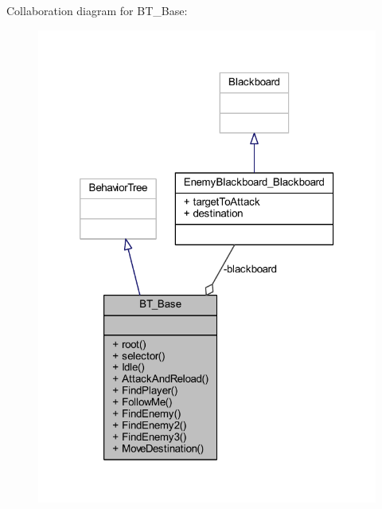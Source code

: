 Collaboration diagram for B\+T\+\_\+\+Base\+:
\nopagebreak
\begin{figure}[H]
\begin{center}
\leavevmode
\includegraphics[width=320pt]{class_b_t___base__coll__graph}
\end{center}
\end{figure}
